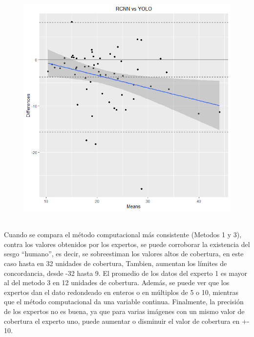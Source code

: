 \documentclass[journal,article,submit,moreauthors,pdftex]{Definitions/mdpi}
\begin{document}
\begin{figure}[H]
    \centering
    \includegraphics[scale=0.4]{RCNN-YOLO.png}
     \centering
    \caption{}
\end{figure}
\\
Cuando se compara el método computacional más consistente (Metodos 1 y 3), contra los valores obtenidos por los expertos, se puede corroborar la existencia del sesgo “humano”, es decir, se sobreestiman los valores altos de cobertura, en este caso hasta en 32 unidades de cobertura, Tambien, aumentan los límites de concordancia, desde -32 hasta 9. El promedio de los datos del experto 1 es mayor al del metodo 3 en 12 unidades de cobertura. Además, se puede ver que los expertos dan el dato redondeado en enteros o en múltiplos de 5 o 10, mientras que el método computacional da una variable continua. Finalmente, la precisión de los expertos no es buena, ya que para varias imágenes con un mismo valor de cobertura el experto uno, puede aumentar o disminuir el valor de cobertura en +- 10.
\end{document}
